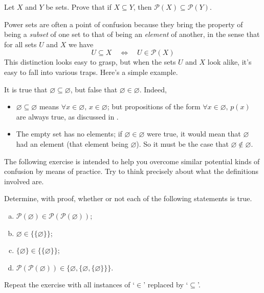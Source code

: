\begin{exercise}
Let $X$ and $Y$ be sets. Prove that if $X \subseteq Y$, then $\mathcal{P}(X) \subseteq \mathcal{P}(Y)$.
\end{exercise}

Power sets are often a point of confusion because they bring the property of being a \textit{subset} of one set to that of being an \textit{element} of another, in the sense that for all sets $U$ and $X$ we have
\[ U \subseteq X \quad \Leftrightarrow \quad U \in \mathcal{P}(X) \]
This distinction looks easy to grasp, but when the sets $U$ and $X$ look alike, it's easy to fall into various traps. Here's a simple example.

\begin{example}
It is true that $\varnothing \subseteq \varnothing$, but false that $\varnothing \in \varnothing$. Indeed,
\begin{itemize}
\item $\varnothing \subseteq \varnothing$ means $\forall x \in \varnothing,\, x \in \varnothing$; but propositions of the form $\forall x \in \varnothing,\, p(x)$ are always true, as discussed in .
\item The empty set has no elements; if $\varnothing \in \varnothing$ were true, it would mean that $\varnothing$ had an element (that element being $\varnothing$). So it must be the case that $\varnothing \not \in \varnothing$.
\end{itemize}
\end{example}

The following exercise is intended to help you overcome similar potential kinds of confusion by means of practice. Try to think precisely about what the definitions involved are.

\begin{exercise}
Determine, with proof, whether or not each of the following statements is true.
\begin{enumerate}[(a)]
\item $\mathcal{P}(\varnothing) \in \mathcal{P}(\mathcal{P}(\varnothing))$;
\item $\varnothing \in \{ \{ \varnothing \} \}$;
\item $\{ \varnothing \} \in \{ \{ \varnothing \} \}$;
\item $\mathcal{P}(\mathcal{P}(\varnothing)) \in \{ \varnothing, \{ \varnothing, \{ \varnothing \} \} \}$.
\end{enumerate}
Repeat the exercise with all instances of `$\in$' replaced by `$\subseteq$'.
\end{exercise}